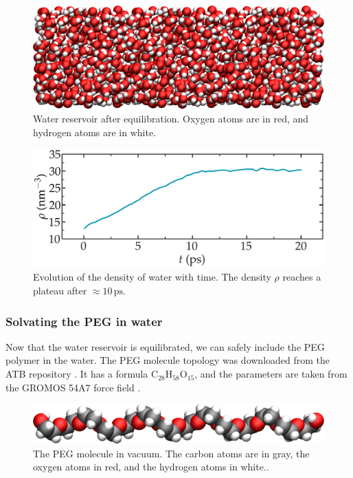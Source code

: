 \documentclass[9pt,tutorial]{livecoms}
\begin{document}
\begin{figure}
\centering
\includegraphics[width=\linewidth]{PEG-water}
\caption{Water reservoir after equilibration. Oxygen atoms are in red, and hydrogen atoms are in white.}
\label{fig:PEG-water}
\end{figure}

\begin{figure}
\centering
\includegraphics[width=\linewidth]{PEG-density}
\caption{Evolution of the density of water with time. The density $\rho$ reaches a plateau after $\approx 10\,\text{ps}$.}
\label{fig:PEG-density}
\end{figure}

\subsubsection{Solvating the PEG in water}
Now that the water reservoir is equilibrated, we can safely include the PEG polymer in the water. The PEG molecule topology was downloaded from the ATB repository \cite{malde2011automated, oostenbrink2004biomolecular}. It has a formula $\text{C}_{28}\text{H}_{58}\text{O}_{15}$, and the parameters are taken from
the GROMOS 54A7 force field \cite{schmid2011definition}.

\begin{figure}
\centering
\includegraphics[width=\linewidth]{PEG-in-vacuum}
\caption{The PEG molecule in vacuum. The carbon atoms are in gray, the oxygen atoms in red, and the hydrogen atoms in white..}
\label{fig:PEG-in-vacuum}
\end{figure}
\end{document}
